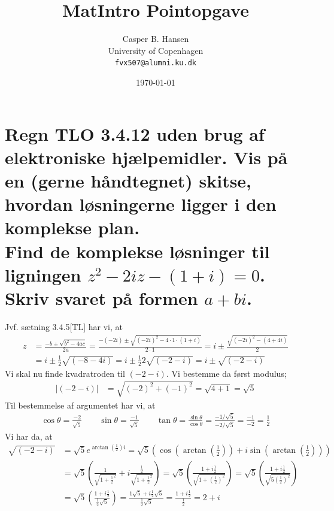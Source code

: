 \documentclass[11pt,a4paper]{article}
\title{MatIntro Pointopgave \assignmentnumber}
\author
{
    Casper B. Hansen\\
    University of Copenhagen\\
    {\tt fvx507@alumni.ku.dk}
}
\date{\today}
\newcommand{\modulus}[1]{\lvert#1\rvert}
\begin{document}


\section
{
    \mdseries
    Regn TLO 3.4.12 uden brug af elektroniske hjælpemidler. Vis på en (gerne
    håndtegnet) skitse, hvordan løsningerne ligger i den komplekse plan.
    \\\indent
    Find de komplekse løsninger til ligningen $z^2 - 2iz - (1 + i) = 0$.
    Skriv svaret på formen $a + bi$.
}
Jvf. sætning 3.4.5[TL] har vi, at
\begin{align}
    z &= \frac{-b \pm \sqrt{b^2 - 4ac}}{2a}
       = \frac{-(-2i) \pm \sqrt{(-2i)^2 - 4 \cdot 1 \cdot (1 + i)}}{2 \cdot 1}
       = i \pm \frac{\sqrt{(-2i)^2 - (4 + 4i)}}{2} \\
      &= i \pm \frac{1}{2} \sqrt{(-8 - 4i)}
       = i \pm \frac{1}{2} 2 \sqrt{(-2 - i)}
       = i \pm \sqrt{(-2 - i)}
       \label{eqn:complex-square}
\end{align}
Vi skal nu finde kvadratroden til $(-2 - i)$. Vi bestemme da først modulus;
\begin{align}
    \modulus{(-2 - i)} &= \sqrt{(-2)^2 + (-1)^2}
                        = \sqrt{4 + 1}
                        = \sqrt{5}
\end{align}
Til bestemmelse af argumentet har vi, at
\begin{align}
    \cos \theta = \frac{-2}{\sqrt{5}}
    \qquad
    \sin \theta = \frac{-1}{\sqrt{5}}
    \qquad
    \tan \theta = \frac{\sin \theta}{\cos \theta}
                = \frac{-1 / \sqrt{5}}{-2 / \sqrt{5}}
                = \frac{-1}{-2}
                = \frac{1}{2}
\end{align}
Vi har da, at
\begin{align}
    \sqrt{(-2 - i)}
    &= \sqrt{5} e^{\arctan(\frac{1}{2}) i}
     = \sqrt{5} \left(
        \cos \left( \arctan \left( \frac{1}{2} \right) \right)
        + i \sin \left( \arctan \left( \frac{1}{2} \right) \right) \right) \\
   &= \sqrt{5} \left( \frac{1}{\sqrt{1 + \frac{1}{2}^2}}
   + i \frac{ \frac{1}{2} }{\sqrt{1 + \frac{1}{2}^2}}\right)
    = \sqrt{5} \left( \frac{1 + i \frac{1}{2}}{\sqrt{1 + \left( \frac{1}{2} \right)^2}} \right)
    = \sqrt{5} \left( \frac{1 + i \frac{1}{2}}{\sqrt{5 \left( \frac{1}{2} \right)^2 }} \right) \\
   &= \sqrt{5} \left( \frac{1 + i \frac{1}{2}}{\frac{1}{2} \sqrt{5}} \right)
    = \frac{1 \sqrt{5} + i \frac{1}{2} \sqrt{5}}{\frac{1}{2} \sqrt{5}}
    = \frac{1 + i \frac{1}{2}}{\frac{1}{2}}
    = 2 + i
\end{align}
\end{document}
